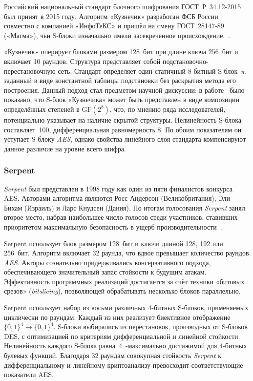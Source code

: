 Российский национальный стандарт блочного шифрования ГОСТ~Р~34.12-2015
был принят в 2015 году. Алгоритм «Кузнечик» разработан ФСБ России совместно
с компанией «ИнфоТеКС» и пришёл на смену ГОСТ~28147-89 («Магма»), чьи
S-блоки изначально имели засекреченное происхождение.~\cite{gost2015}.

«Кузнечик» оперирует блоками размером 128~бит при длине ключа 256~бит
и включает 10 раундов. Структура представляет собой подстановочно-перестановочную сеть.
Стандарт определяет один статичный 8-битный S-блок~$\pi$, заданный в виде
константной таблицы подстановки без раскрытия метода его построения.
Данный подход стал предметом научной дискуссии: в работе~\cite{biryukov2016}
было показано, что S-блок «Кузнечика» может быть представлен в виде
композиции определённых степеней в $\mathrm{GF}(2^8)$, что, по мнению ряда
исследователей, потенциально указывает на наличие скрытой структуры.
Нелинейность S-блока составляет~100, дифференциальная равномерность 8.
По обоим показателям он уступает S-блоку \textit{AES}, однако свойства линейного слоя
стандарта компенсируют данное различие на уровне всего шифра.

\subsubsection{Serpent}

\textit{Serpent} был представлен в 1998 году как один из пяти финалистов конкурса
AES. Авторами алгоритма являются Росс Андерсон (Великобритания), Эли Бихам
(Израиль) и Ларс Кнудсен (Дания). По итогам голосования \textit{Serpent} занял второе
место, набрав наибольшее число голосов среди участников, ставивших приоритетом
максимальную безопасность в ущерб производительности~\cite{serpent1998}.

Serpent использует блок размером 128~бит и ключи длиной 128, 192 или 256~бит.
Алгоритм включает 32 раунда, что вдвое превышает количество раундов \textit{AES}.
Авторы сознательно придерживались консервативного подхода, обеспечивающего
значительный запас стойкости к будущим атакам. Эффективность программных
реализаций достигается за счёт техники «битовых срезов» (\textit{bitslicing}),
позволяющей обрабатывать несколько блоков параллельно.

Serpent использует набор из восьми различных 4-битных S-блоков, применяемых
циклически по раундам. Каждый из них реализует биективное отображение
$\{0,1\}^4 \to \{0,1\}^4$. S-блоки выбирались из перестановок, производных
от S-блоков DES, с оптимизацией по критериям дифференциальной и линейной
стойкости. Нелинейность каждого S-блока равна~4~-максимально достижимой
для 4-битных булевых функций. Благодаря 32 раундам совокупная стойкость
\textit{Serpent} к дифференциальному и линейному криптоанализу превосходит
соответствующие показатели AES.

